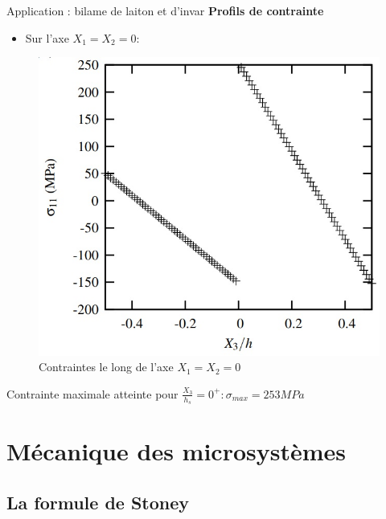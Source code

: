 \documentclass{beamer}
\begin{document}
\begin{frame}{Application : bilame de laiton et d'invar}
    \textbf{\Large{Profils de contrainte}}
    
    \begin{itemize}
        \item Sur l'axe $X_1=X_2=0$:
    \end{itemize}
    \begin{figure}
        \centering
        \includegraphics[scale=0.5]{imgs/graph3.jpg}
        \caption{Contraintes le long de l'axe $X_1=X_2=0$}
    \end{figure}
    Contrainte maximale atteinte pour $\frac{X_3}{h_s} = 0^+ : \sigma_{max} = 253 MPa$
\end{frame}

\section{Mécanique des microsystèmes} %

\subsection{La formule de Stoney} %
\end{document}
